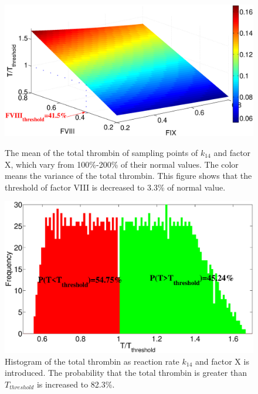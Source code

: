 \begin{figure}
  \begin{center}
  \includegraphics[width=5in]{figures/F89m.eps}
\caption{The mean of the total thrombin of sampling points of
$k_{14}$ and factor X, which vary from 100\%-200\% of their normal
values. The color means the variance of the total thrombin. This
figure shows that the threshold of factor VIII is decreased to 3.3\%
of normal value.}\label{Fig:F89m}

  \includegraphics[width=5in]{figures/F89mhist.eps}
\caption{Histogram of the total thrombin as reaction rate $k_{14}$
and factor X is introduced. The probability that the total thrombin
is greater than $T_{threshold}$ is increased to
82.3\%.}\label{Fig:F89mhist}
  \end{center}
\end{figure}
